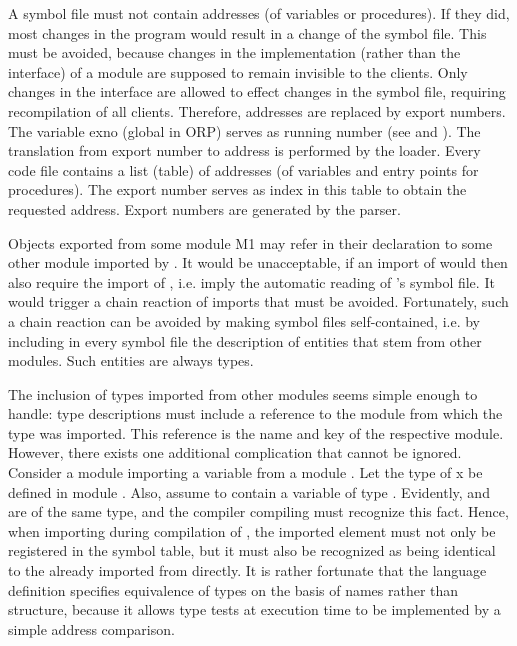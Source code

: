 A symbol file must not contain addresses (of variables or procedures). If they did, most changes in the program would result in a change of the symbol file. This must be avoided, because changes in the implementation (rather than the interface) of a module are supposed to remain invisible to the clients. Only changes in the interface are allowed to effect changes in the symbol file, requiring recompilation of all clients. Therefore, addresses are replaced by export numbers. The variable exno (global in ORP) serves as running number (see  and ). The translation from export number to address is performed by the loader. Every code file contains a list (table) of addresses (of variables and entry points for procedures). The export number serves as index in this table to obtain the requested address. Export numbers are generated by the parser.

Objects exported from some module M1 may refer in their declaration to some other module  imported by . It would be unacceptable, if an import of  would then also require the import of , i.e. imply the automatic reading of 's symbol file. It would trigger a chain reaction of imports that must be avoided. Fortunately, such a chain reaction can be avoided by making symbol files self-contained, i.e. by including in every symbol file the description of entities that stem from other modules. Such entities are always types.

The inclusion of types imported from other modules seems simple enough to handle: type descriptions must include a reference to the module from which the type was imported. This reference is the name and key of the respective module. However, there exists one additional complication that cannot be ignored. Consider a module  importing a variable  from a module . Let the type  of x be defined in module . Also, assume  to contain a variable  of type . Evidently,  and  are of the same type, and the compiler compiling  must recognize this fact. Hence, when importing  during compilation of , the imported element  must not only be registered in the symbol table, but it must also be recognized as being identical to the  already imported from  directly. It is rather fortunate that the language definition specifies equivalence of types on the basis of names rather than structure, because it allows type tests at execution time to be implemented by a simple address comparison.

